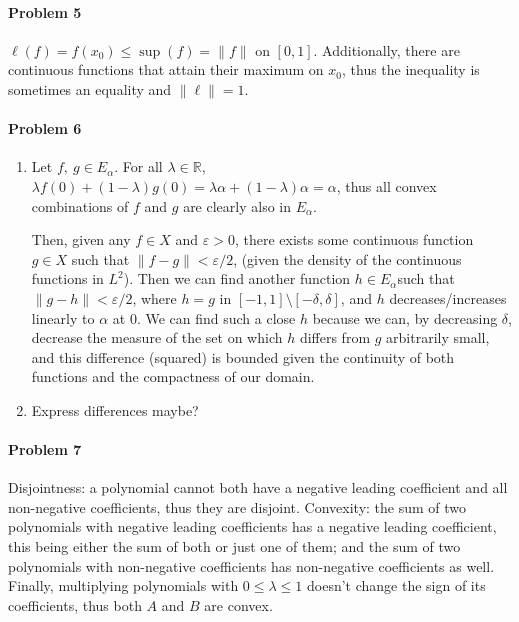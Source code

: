 \documentclass[12pt]{article}
\begin{document}
\paragraph{Problem 5}
$\ell(f) = f(x_0) \leq \sup(f) = \|f\|$ on $[0,1]$. Additionally, there are
continuous functions that attain their maximum on $x_0$, thus the
inequality is sometimes an equality and $\|\ell\| = 1$.

\paragraph{Problem 6}
\begin{enumerate}[label=(\alph*)]
\item 
  Let $f,\ g \in E_\alpha$. For all $\lambda \in \mathbb{R}$, $\lambda f(0) +
  (1-\lambda)g(0) = \lambda \alpha + (1-\lambda) \alpha = \alpha$, thus all
  convex combinations of $f$ and $g$ are clearly also in $E_\alpha$.

  Then, given
  any $f \in X$ and $\varepsilon > 0$, there exists some continuous function
  $g \in X$ such that $\|f - g\| < \varepsilon/2$, (given the density of the
  continuous functions in $L^2$). Then we can find another function $h \in E_\alpha
  $such that $\|g-h\| < \varepsilon/2$, where $h = g$ in $[-1,1]\setminus [-\delta
  ,\delta]$, and $h$ decreases/increases linearly to $\alpha$ at $0$. We can find
  such a close $h$ because we can, by decreasing $\delta$, decrease the measure
  of the set on which $h$ differs from $g$ arbitrarily small, and this difference
  (squared) is bounded given the continuity of both functions and the compactness
  of our domain.
\item Express differences maybe?
  
\end{enumerate}

\paragraph{Problem 7}

Disjointness: a polynomial cannot both have a negative leading
coefficient and all non-negative coefficients, thus they are disjoint.
Convexity: the sum of two polynomials with negative leading coefficients has
a negative leading coefficient, this being either the sum of both or just one
of them; and the sum of two polynomials with non-negative coefficients has
non-negative coefficients as well. Finally, multiplying polynomials with
$0\leq \lambda \leq 1$ doesn't change the sign of its coefficients, thus both
$A$ and $B$ are convex.
\end{document}
